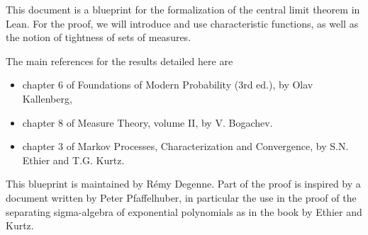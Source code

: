 
This document is a blueprint for the formalization of the central limit theorem in Lean.
For the proof, we will introduce and use characteristic functions, as well as the notion of tightness of sets of measures.

The main references for the results detailed here are
\begin{itemize}
	\item chapter 6 of Foundations of Modern Probability (3rd ed.), by Olav Kallenberg,
	\item chapter 8 of Measure Theory, volume II, by V. Bogachev.
	\item chapter 3 of Markov Processes, Characterization and Convergence, by S.N. Ethier and T.G. Kurtz.
\end{itemize}

This blueprint is maintained by R\'emy Degenne. Part of the proof is inspired by a document written by Peter Pfaffelhuber, in particular the use in the proof of the separating sigma-algebra of exponential polynomials as in the book by Ethier and Kurtz.







